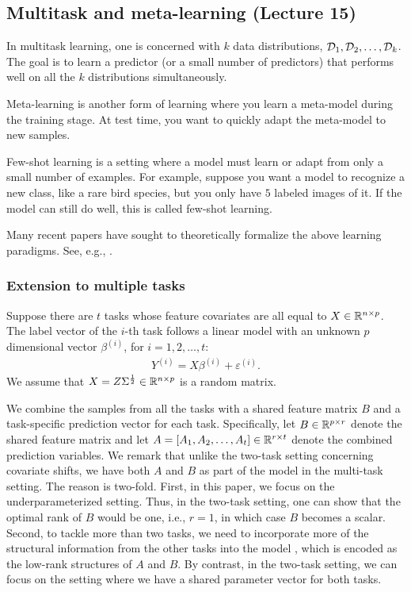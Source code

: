 \subsection{Multitask and meta-learning (Lecture 15)}

In multitask learning, one is concerned with $k$ data distributions, $\mathcal{D}_1, \mathcal{D}_2, \dots, \mathcal{D}_k$.
The goal is to learn a predictor (or a small number of predictors) that performs well on all the $k$ distributions simultaneously.

Meta-learning is another form of learning where you learn a meta-model during the training stage.
At test time, you want to quickly adapt the meta-model to new samples.

Few-shot learning is a setting where a model must learn or adapt from only a small number of examples.
For example, suppose you want a model to recognize a new class, like a rare bird species, but you only have $5$ labeled images of it. If the model can still do well, this is called few-shot learning.

Many recent papers have sought to theoretically formalize the above learning paradigms. See, e.g.,  \citep{wu2020understanding, finn2019online, du2020few}.

\iffalse
\subsubsection{Extension to multiple tasks}

Suppose there are $t$ tasks whose feature covariates are all equal to $X \in \mathbb{R}^{n \times p}$. The label vector of the $i$-th task follows a linear model with an unknown $p$ dimensional vector $\beta^{(i)}$, for $i=1, 2,\dots, t$:
\begin{align}\label{eq_mtl_data}
    Y^{(i)} = X \beta^{(i)} + \varepsilon^{(i)}.
\end{align}
We assume that $X = Z\Sigma^{\frac 1 2} \in \mathbb{R}^{n \times p}$ is a random matrix.

We combine the samples from all the tasks with a shared feature matrix $B$ and a task-specific prediction vector for each task.
Specifically, let $B \in \mathbb{R}^{p \times r}$ denote the shared feature matrix and let $A = [A_1, A_2, \dots, A_t] \in \mathbb{R}^{r \times t}$ denote the combined prediction variables.
We remark that unlike the two-task setting concerning covariate shifts, we have both $A$ and $B$ as part of the model in the multi-task setting. The reason is two-fold.
First, in this paper, we focus on the underparameterized setting. Thus, in the two-task setting, one can show that the optimal rank of $B$ would be one, i.e., $r = 1$, in which case $B$ becomes a scalar. 
Second, to tackle more than two tasks, we need to incorporate more of the structural information from the other tasks into the model \citep{AZ05}, which is encoded as the low-rank structures of $A$ and $B$. By contrast, in the two-task setting, we can focus on the setting where we have a shared parameter vector for both tasks.

